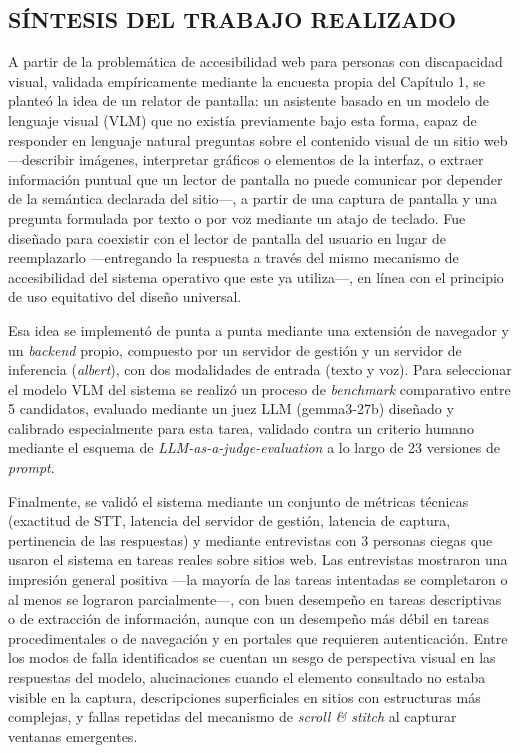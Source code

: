 \newpage
{}

\subsection{SÍNTESIS DEL TRABAJO REALIZADO}

A partir de la problemática de accesibilidad web para personas con discapacidad visual, validada empíricamente mediante la encuesta propia del Capítulo 1, se planteó la idea de un relator de pantalla: un asistente basado en un modelo de lenguaje visual (VLM) que no existía previamente bajo esta forma, capaz de responder en lenguaje natural preguntas sobre el contenido visual de un sitio web —describir imágenes, interpretar gráficos o elementos de la interfaz, o extraer información puntual que un lector de pantalla no puede comunicar por depender de la semántica declarada del sitio—, a partir de una captura de pantalla y una pregunta formulada por texto o por voz mediante un atajo de teclado. Fue diseñado para coexistir con el lector de pantalla del usuario en lugar de reemplazarlo —entregando la respuesta a través del mismo mecanismo de accesibilidad del sistema operativo que este ya utiliza—, en línea con el principio de uso equitativo del diseño universal.

Esa idea se implementó de punta a punta mediante una extensión de navegador y un \textit{backend} propio, compuesto por un servidor de gestión y un servidor de inferencia (\textit{albert}), con dos modalidades de entrada (texto y voz). Para seleccionar el modelo VLM del sistema se realizó un proceso de \textit{benchmark} comparativo entre 5 candidatos, evaluado mediante un juez LLM (gemma3-27b) diseñado y calibrado especialmente para esta tarea, validado contra un criterio humano mediante el esquema de \textit{LLM-as-a-judge-evaluation} a lo largo de 23 versiones de \textit{prompt}.

Finalmente, se validó el sistema mediante un conjunto de métricas técnicas (exactitud de STT, latencia del servidor de gestión, latencia de captura, pertinencia de las respuestas) y mediante entrevistas con 3 personas ciegas que usaron el sistema en tareas reales sobre sitios web. Las entrevistas mostraron una impresión general positiva —la mayoría de las tareas intentadas se completaron o al menos se lograron parcialmente—, con buen desempeño en tareas descriptivas o de extracción de información, aunque con un desempeño más débil en tareas procedimentales o de navegación y en portales que requieren autenticación. Entre los modos de falla identificados se cuentan un sesgo de perspectiva visual en las respuestas del modelo, alucinaciones cuando el elemento consultado no estaba visible en la captura, descripciones superficiales en sitios con estructuras más complejas, y fallas repetidas del mecanismo de \textit{scroll \& stitch} al capturar ventanas emergentes.

